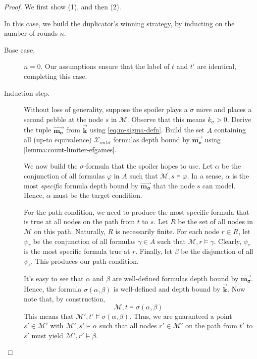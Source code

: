 \documentclass[a4paper,UKenglish,cleveref, autoref, thm-restate, numberwithinsect]{lipics-v2021}
\newcommand{\myvec}[1]{\overrightarrow{\mathbf{#1}}}
\begin{document}
\begin{proof}
    We first show (1), and then (2).

     In this case, we build the duplicator's winning strategy, by inducting on the number of rounds $n$.

    \begin{description}
        \item[Base case.] $n = 0$. Our assumptions ensure that the label of $t$ and $t'$ are identical, completing this case.
        \item[Induction step.]
            Without loss of generality, suppose the spoiler plays a $\sigma$ move and places a second pebble at the node $s$ in $\mathcal{M}$. Observe that this means $k_\sigma > 0$. Derive the tuple $\myvec{m_\sigma}$ from $\myvec{k}$ using \cref{eq:m-sigma-defn}. Build the set $A$ containing all (up-to equivalence) $\mathcal{X}_{until}$ formulas depth bound by $\myvec{m_\sigma}$ using \cref{lemma:count-limiter-efgames}.

            We now build the $\sigma$-formula that the spoiler hopes to use. Let $\alpha$ be the conjunction of all formulas $\varphi$ in $A$ such that $\mathcal{M}, s \vDash \varphi$. In a sense, $\alpha$ is the most \textit{specific} formula depth bound by $\myvec{m_\sigma}$ that the node $s$ can model. Hence, $\alpha$ must be the target condition.

            For the path condition, we need to produce the most specific formula that is true at all nodes on the path from $t$ to $s$. Let $R$ be the set of all nodes in $\mathcal{M}$ on this path. Naturally, $R$ is necessarily finite. For each node $r \in R$, let $\psi_r$ be the conjunction of all formulas $\gamma \in A$ such that $\mathcal{M}, r \vDash \gamma$. Clearly, $\psi_r$ is the most specific formula true at $r$. Finally, let $\beta$ be the disjunction of all $\psi_r$. This produces our path condition.

            It's easy to see that $\alpha$ and $\beta$ are well-defined formulas depth bound by $\myvec{m_\sigma}$. Hence, the formula $\sigma(\alpha, \beta)$ is well-defined and depth bound by $\myvec{k}$. Now note that, by construction,
            \begin{equation*}
                \mathcal{M}, t \vDash \sigma(\alpha, \beta)
            \end{equation*}
            This means that $\mathcal{M}', t' \vDash \sigma(\alpha, \beta)$. Thus, we are guaranteed a point $s' \in \mathcal{M}'$ with $\mathcal{M}', s' \vDash \alpha$ such that all nodes $r' \in \mathcal{M}'$ on the path from $t'$ to $s'$ must yield $\mathcal{M}', r' \vDash \beta$.


\end{description}
\end{proof}
\end{document}
